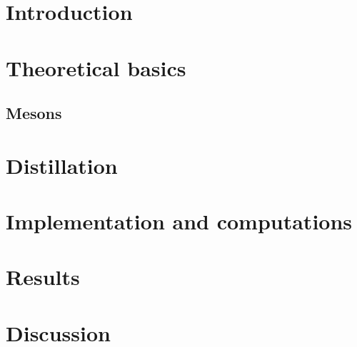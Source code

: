 \documentclass{style}
\begin{document}
    \section{Introduction}
    
	\section{Theoretical basics}
	
	
	
	
	
	\subsection{Mesons}
	
	\newpage
	
	\section{Distillation}
	
	
	
	\newpage
	\section{Implementation and computations}\label{section:implementation}
	
	
	
	\section{Results}
	
	
	
	\section{Discussion}
	
	
	
	\newpage
	
	
\end{document}
